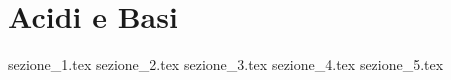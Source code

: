\chapter{Acidi e Basi}
{sezione_1.tex}
{sezione_2.tex}
{sezione_3.tex}
{sezione_4.tex}
{sezione_5.tex}